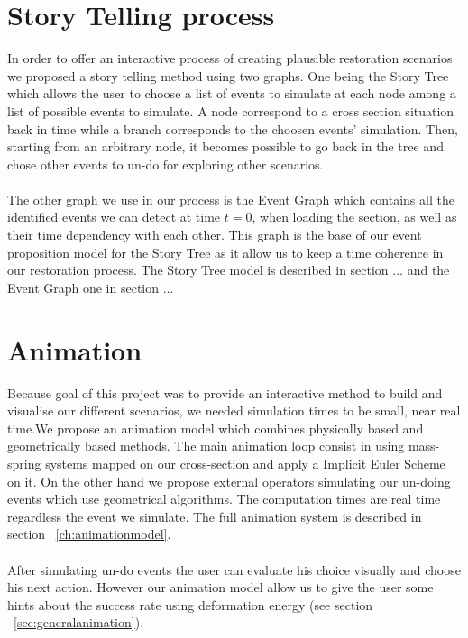 \documentclass[12pt, a4paper]{report} %
\begin{document}
\section{Story Telling process}
\label{sub:storytel}
In order to offer an interactive process of creating plausible restoration scenarios we proposed a story telling method using two graphs. One being the Story Tree which allows the user to choose a list of events to simulate at each node among a list of possible events to simulate. A node correspond to a cross section situation back in time while a branch corresponds to the choosen events' simulation. Then, starting from an arbitrary node, it becomes possible to go back in the tree and chose other events to un-do for exploring other scenarios.\\\\
The other graph we use in our process is the Event Graph which contains all the identified events we can detect at time $t = 0$, when loading the section, as well as their time dependency with each other. This graph is the base of our event proposition model for the Story Tree as it allow us to keep a time coherence in our restoration process. The Story Tree model is described in section ... and the Event Graph one in section ...
\section{Animation}
Because goal of this project was to provide an interactive method to build and visualise our different scenarios, we needed simulation times to be small, near real time.We propose an animation model which combines physically based and geometrically based methods. The main animation loop consist in using mass-spring systems mapped on our cross-section and apply a Implicit Euler Scheme on it. On the other hand we propose external operators simulating our un-doing events which use geometrical algorithms. The computation times are real time regardless the event we simulate. The full animation system is described in section ~\ref{ch:animationmodel}.\\\\
After simulating un-do events the user can evaluate his choice visually and choose his next action. However our animation model allow us to give the user some hints about the success rate using deformation energy (see section ~\ref{sec:generalanimation}).
\end{document}
